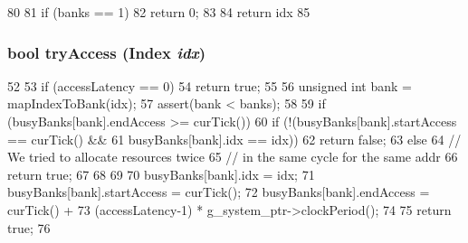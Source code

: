 \begin{DoxyCode}
80 {
81     if (banks == 1) {
82         return 0;
83     }
84     return idx %
85 }
\end{DoxyCode}
\hypertarget{classBankedArray_aaa85fb1f3c3aa637e08af3002b00111d}{
\subsubsection[{tryAccess}]{\setlength{\rightskip}{0pt plus 5cm}bool tryAccess ({\bf Index} {\em idx})}}
\label{classBankedArray_aaa85fb1f3c3aa637e08af3002b00111d}



\begin{DoxyCode}
52 {
53     if (accessLatency == 0)
54         return true;
55 
56     unsigned int bank = mapIndexToBank(idx);
57     assert(bank < banks);
58 
59     if (busyBanks[bank].endAccess >= curTick()) {
60         if (!(busyBanks[bank].startAccess == curTick() &&
61             busyBanks[bank].idx == idx)) {
62             return false;
63         } else {
64             // We tried to allocate resources twice
65             // in the same cycle for the same addr
66             return true;
67         }
68     }
69 
70     busyBanks[bank].idx = idx;
71     busyBanks[bank].startAccess = curTick();
72     busyBanks[bank].endAccess = curTick() +
73         (accessLatency-1) * g_system_ptr->clockPeriod();
74 
75     return true;
76 }
\end{DoxyCode}


